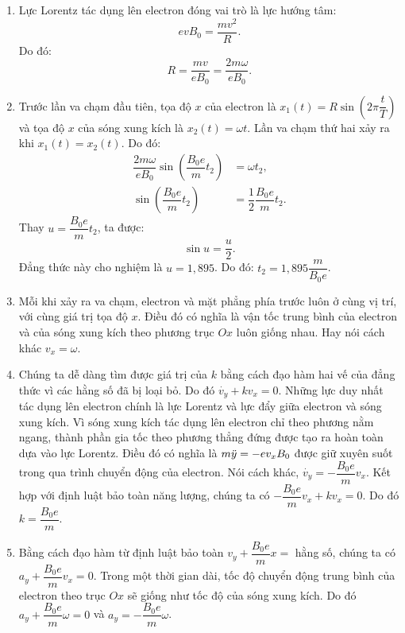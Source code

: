 \begin{loigiai}
\begin{enumerate}[1)]
\begin{center}
\end{center}
    \item Lực Lorentz tác dụng lên electron đóng vai trò là lực hướng tâm:
    \[evB_0=\dfrac{mv^2}{R}.\]
 Do đó: \[R=\dfrac{mv}{eB_0}=\dfrac{2m\omega}{eB_0}.\]

    \item Trước lần va chạm đầu tiên, tọa độ $x$ của electron là $x_1(t)=R\sin{\left(2\pi\dfrac{t}{T}\right)}$ và tọa độ $x$ của sóng xung kích là $x_2(t)=\omega t$. Lần va chạm thứ hai xảy ra khi $x_1(t)=x_2(t)$. Do đó:
    \begin{align*}
    \dfrac{2m\omega}{eB_0}\sin{\left(\dfrac{B_0e}{m}t_2\right)}&=\omega t_2,\\
    \sin{\left(\dfrac{B_0e}{m}t_2\right)}&=\dfrac{1}{2}\dfrac{B_0e}{m}t_2.
    \end{align*}
    Thay $u=\dfrac{B_0e}{m}t_2$, ta được:
    \[\sin{u}=\dfrac{u}{2}.\]
    Đẳng thức này cho nghiệm là $u=1,895$. Do đó: $t_2=1,895 \dfrac{m}{B_0e}$.
    \item Mỗi khi xảy ra va chạm, electron và mặt phẳng phía trước luôn ở cùng vị trí, với cùng giá trị tọa độ $x$. Điều đó có nghĩa là vận tốc trung bình của electron và của sóng xung kích theo phương trục $Ox$ luôn giống nhau. Hay nói cách khác $v_{x}=\omega$.
    \item Chúng ta dễ dàng tìm được giá trị của $k$ bằng cách đạo hàm hai vế của đẳng thức vì các hằng số đã bị loại bỏ. Do đó $\Dot{v_{y}}+kv_{x}=0$. Những lực duy nhất tác dụng lên electron chính là lực Lorentz và lực đẩy giữa electron và sóng xung kích. Vì sóng xung kích tác dụng lên electron chỉ theo phương nằm ngang, thành phần gia tốc theo phương thẳng đứng được tạo ra hoàn toàn dựa vào lực Lorentz. Điều đó có nghĩa là $m\Ddot{y}=-ev_{x}B_0$ được giữ xuyên suốt trong qua trình chuyển động của electron. Nói cách khác, $\Dot{v_{y}}=-\dfrac{B_0e}{m}v_{x}$. Kết hợp với định luật bảo toàn năng lượng, chúng ta có $-\dfrac{B_0e}{m}v_{x}+kv_{x}=0$. Do đó $k=\dfrac{B_0e}{m}$.
    \item Bằng cách đạo hàm từ định luật bảo toàn $v_{y}+\dfrac{B_0e}{m}x=$ hằng số, chúng ta có $a_{y}+\dfrac{B_0e}{m}v_{x}=0$. Trong một thời gian dài, tốc độ chuyển động trung bình của electron theo trục $Ox$ sẽ giống như tốc độ của sóng xung kích. Do đó $a_{y}+\dfrac{B_0e}{m}\omega=0$ và $a_{y}=-\dfrac{B_0e}{m}\omega$.

\end{enumerate}
\end{loigiai}
